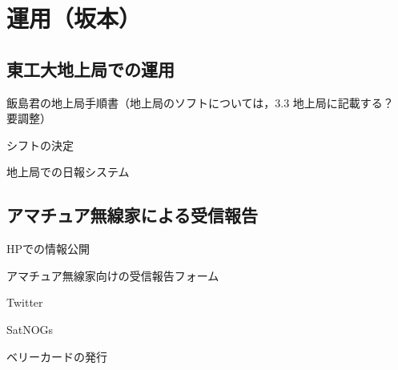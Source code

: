 \section{運用（坂本）}

\subsection{東工大地上局での運用}

飯島君の地上局手順書（地上局のソフトについては，3.3 地上局に記載する？　要調整）

シフトの決定

地上局での日報システム



\subsection{アマチュア無線家による受信報告}
HPでの情報公開

アマチュア無線家向けの受信報告フォーム

Twitter

SatNOGs

ベリーカードの発行